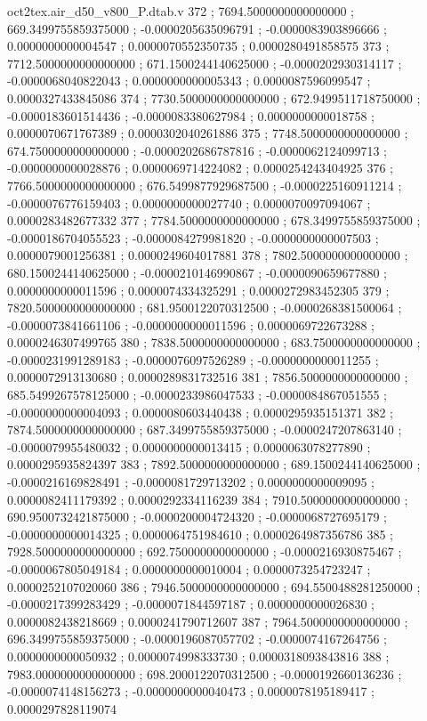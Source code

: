 \begin{filecontents}[overwrite]{oct2tex.air_d50_v800_P.dtab.v}
372 ; 7694.5000000000000000 ; 669.3499755859375000 ; -0.0000205635096791 ; -0.0000083903896666 ; 0.0000000000004547 ; 0.0000070552350735 ; 0.0000280491858575
373 ; 7712.5000000000000000 ; 671.1500244140625000 ; -0.0000202930314117 ; -0.0000068040822043 ; 0.0000000000005343 ; 0.0000087596099547 ; 0.0000327433845086
374 ; 7730.5000000000000000 ; 672.9499511718750000 ; -0.0000183601514436 ; -0.0000083380627984 ; 0.0000000000018758 ; 0.0000070671767389 ; 0.0000302040261886
375 ; 7748.5000000000000000 ; 674.7500000000000000 ; -0.0000202686787816 ; -0.0000062124099713 ; -0.0000000000028876 ; 0.0000069714224082 ; 0.0000254243404925
376 ; 7766.5000000000000000 ; 676.5499877929687500 ; -0.0000225160911214 ; -0.0000076776159403 ; 0.0000000000027740 ; 0.0000070097094067 ; 0.0000283482677332
377 ; 7784.5000000000000000 ; 678.3499755859375000 ; -0.0000186704055523 ; -0.0000084279981820 ; -0.0000000000007503 ; 0.0000079001256381 ; 0.0000249604017881
378 ; 7802.5000000000000000 ; 680.1500244140625000 ; -0.0000210146990867 ; -0.0000090659677880 ; 0.0000000000011596 ; 0.0000074334325291 ; 0.0000272983452305
379 ; 7820.5000000000000000 ; 681.9500122070312500 ; -0.0000268381500064 ; -0.0000073841661106 ; -0.0000000000011596 ; 0.0000069722673288 ; 0.0000246307499765
380 ; 7838.5000000000000000 ; 683.7500000000000000 ; -0.0000231991289183 ; -0.0000076097526289 ; -0.0000000000011255 ; 0.0000072913130680 ; 0.0000289831732516
381 ; 7856.5000000000000000 ; 685.5499267578125000 ; -0.0000233986047533 ; -0.0000084867051555 ; -0.0000000000004093 ; 0.0000080603440438 ; 0.0000295935151371
382 ; 7874.5000000000000000 ; 687.3499755859375000 ; -0.0000247207863140 ; -0.0000079955480032 ; 0.0000000000013415 ; 0.0000063078277890 ; 0.0000295935824397
383 ; 7892.5000000000000000 ; 689.1500244140625000 ; -0.0000216169828491 ; -0.0000081729713202 ; 0.0000000000009095 ; 0.0000082411179392 ; 0.0000292334116239
384 ; 7910.5000000000000000 ; 690.9500732421875000 ; -0.0000200004724320 ; -0.0000068727695179 ; -0.0000000000014325 ; 0.0000064751984610 ; 0.0000264987356786
385 ; 7928.5000000000000000 ; 692.7500000000000000 ; -0.0000216930875467 ; -0.0000067805049184 ; 0.0000000000010004 ; 0.0000073254723247 ; 0.0000252107020060
386 ; 7946.5000000000000000 ; 694.5500488281250000 ; -0.0000217399283429 ; -0.0000071844597187 ; 0.0000000000026830 ; 0.0000082438218669 ; 0.0000241790712607
387 ; 7964.5000000000000000 ; 696.3499755859375000 ; -0.0000196087057702 ; -0.0000074167264756 ; 0.0000000000050932 ; 0.0000074998333730 ; 0.0000318093843816
388 ; 7983.0000000000000000 ; 698.2000122070312500 ; -0.0000192660136236 ; -0.0000074148156273 ; -0.0000000000040473 ; 0.0000078195189417 ; 0.0000297828119074

\end{filecontents}
